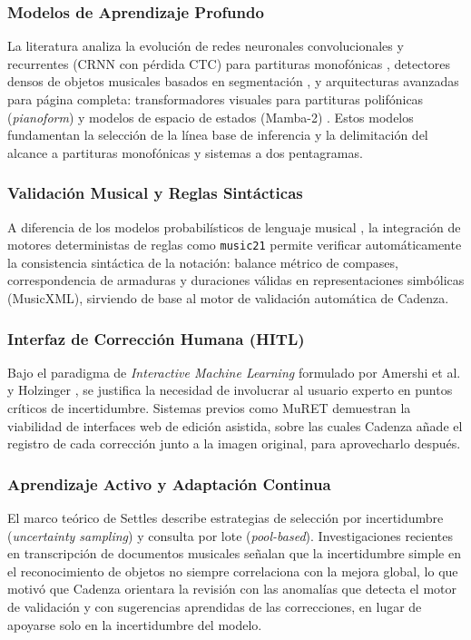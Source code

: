 \documentclass[conference]{IEEEtran}
\begin{document}
\subsubsection{Modelos de Aprendizaje Profundo}
La literatura analiza la evolución de redes neuronales convolucionales y recurrentes (CRNN con pérdida CTC) para partituras monofónicas \cite{calvo2018}, detectores densos de objetos musicales basados en segmentación \cite{tuggener2018}, y arquitecturas avanzadas para página completa: transformadores visuales para partituras polifónicas (\emph{pianoform}) \cite{riosvila2026} y modelos de espacio de estados (Mamba-2) \cite{m2omr2026}. Estos modelos fundamentan la selección de la línea base de inferencia y la delimitación del alcance a partituras monofónicas y sistemas a dos pentagramas.

\subsubsection{Validación Musical y Reglas Sintácticas}
A diferencia de los modelos probabilísticos de lenguaje musical \cite{omr2020}, la integración de motores deterministas de reglas como \texttt{music21} \cite{cuthbert2010} permite verificar automáticamente la consistencia sintáctica de la notación: balance métrico de compases, correspondencia de armaduras y duraciones válidas en representaciones simbólicas (MusicXML), sirviendo de base al motor de validación automática de Cadenza.

\subsubsection{Interfaz de Corrección Humana (HITL)}
Bajo el paradigma de \emph{Interactive Machine Learning} formulado por Amershi et al. \cite{amershi2014} y Holzinger \cite{holzinger2016}, se justifica la necesidad de involucrar al usuario experto en puntos críticos de incertidumbre. Sistemas previos como MuRET \cite{rizo2023} demuestran la viabilidad de interfaces web de edición asistida, sobre las cuales Cadenza añade el registro de cada corrección junto a la imagen original, para aprovecharlo después.

\subsubsection{Aprendizaje Activo y Adaptación Continua}
El marco teórico de Settles \cite{settles2009} describe estrategias de selección por incertidumbre (\emph{uncertainty sampling}) y consulta por lote (\emph{pool-based}). Investigaciones recientes en transcripción de documentos musicales \cite{mlsp2025} señalan que la incertidumbre simple en el reconocimiento de objetos no siempre correlaciona con la mejora global, lo que motivó que Cadenza orientara la revisión con las anomalías que detecta el motor de validación y con sugerencias aprendidas de las correcciones, en lugar de apoyarse solo en la incertidumbre del modelo.
\end{document}
